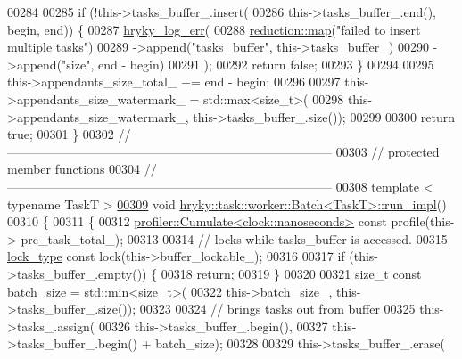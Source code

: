 \begin{DoxyCode}
00284 
00285     \textcolor{keywordflow}{if} (!this->tasks\_buffer\_.insert(
00286         this->tasks\_buffer\_.end(), begin, end)) \{
00287         \hyperlink{log__writer__common_8h_ae5ad3dabb33f594695ef40753cb78aad}{hryky_log_err}(
00288             \hyperlink{namespacehryky_1_1reduction_ac5eae270cf8047b294dc4ff3e5e11a79}{reduction::map}(\textcolor{stringliteral}{"failed to insert multiple tasks"})
00289             ->append(\textcolor{stringliteral}{"tasks\_buffer"}, this->tasks\_buffer\_)
00290             ->append(\textcolor{stringliteral}{"size"}, end - begin)
00291             );
00292         \textcolor{keywordflow}{return} \textcolor{keyword}{false};
00293     \}
00294 
00295     this->appendants\_size\_total\_ += end - begin;
00296 
00297     this->appendants\_size\_watermark\_ = std::max<size\_t>(
00298         this->appendants\_size\_watermark\_, this->tasks\_buffer\_.size());
00299 
00300     \textcolor{keywordflow}{return} \textcolor{keyword}{true};
00301 \}
00302 \textcolor{comment}{//
      ------------------------------------------------------------------------------}
00303 \textcolor{comment}{// protected member functions}
00304 \textcolor{comment}{//
      ------------------------------------------------------------------------------}
00308 \textcolor{comment}{}\textcolor{keyword}{template} < \textcolor{keyword}{typename} TaskT >
\hypertarget{task__worker__batch_8h_source_l00309}{}\hyperlink{group__task_ga1f7366c2252fb0c7a7c8dc6f92a31e88}{00309} \textcolor{keywordtype}{void} \hyperlink{classhryky_1_1task_1_1worker_1_1_batch}{hryky::task::worker::Batch<TaskT>::run_impl}()
00310 \{
00311     \{
00312         \hyperlink{classhryky_1_1profiler_1_1_cumulate}{profiler::Cumulate<clock::nanoseconds>} \textcolor{keyword}{const} profile(this->
      pre\_task\_total\_);
00313 
00314         \textcolor{comment}{// locks while tasks\_buffer is accessed.}
00315         \hyperlink{classhryky_1_1exclusion_1_1_lock}{lock_type} \textcolor{keyword}{const} lock(this->buffer\_lockable\_);
00316 
00317         \textcolor{keywordflow}{if} (this->tasks\_buffer\_.empty()) \{
00318             \textcolor{keywordflow}{return};
00319         \}
00320 
00321         \textcolor{keywordtype}{size\_t} \textcolor{keyword}{const} batch\_size = std::min<size\_t>(
00322             this->batch\_size\_, this->tasks\_buffer\_.size());
00323 
00324         \textcolor{comment}{// brings tasks out from buffer}
00325         this->tasks\_.assign(
00326             this->tasks\_buffer\_.begin(),
00327             this->tasks\_buffer\_.begin() + batch\_size);
00328 
00329         this->tasks\_buffer\_.erase(

\end{DoxyCode}
